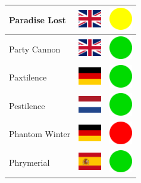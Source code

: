 \documentclass[12pt, a4paper, twoside]{report}
\begin{document}
\begin{center}
\begin{longtable}{|p{5cm}|p{2cm}|p{2cm}|}
			Paradise Lost & \includegraphics[width=1cm]{4x3/gb} & \includegraphics[width=1cm]{likes/m} \\ \hline
			Party Cannon & \includegraphics[width=1cm]{4x3/gb} & \includegraphics[width=1cm]{likes/y} \\ \hline
			Paxtilence & \includegraphics[width=1cm]{4x3/de} & \includegraphics[width=1cm]{likes/y} \\ \hline
			Pestilence & \includegraphics[width=1cm]{4x3/nl} & \includegraphics[width=1cm]{likes/y} \\ \hline
			Phantom Winter & \includegraphics[width=1cm]{4x3/de} & \includegraphics[width=1cm]{likes/n} \\ \hline
			Phrymerial & \includegraphics[width=1cm]{4x3/es} & \includegraphics[width=1cm]{likes/y} \\ \hline

\end{longtable}
\end{center}
\end{document}
